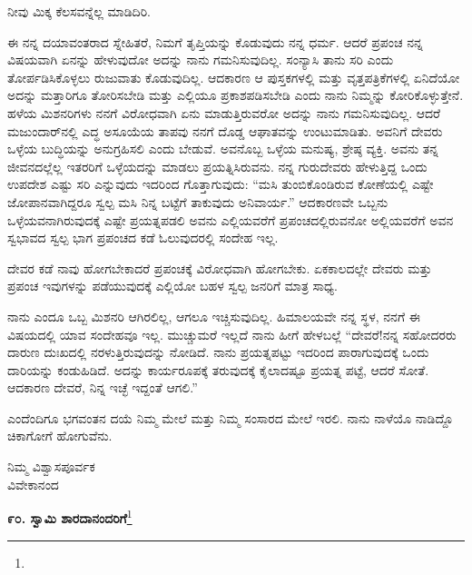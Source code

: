 \vspace{0.1cm}

ನೀವು ಮಿಕ್ಕ ಕೆಲಸವನ್ನೆಲ್ಲ ಮಾಡಿದಿರಿ.

ಈ ನನ್ನ ದಯಾವಂತರಾದ ಸ್ನೇಹಿತರೆ, ನಿಮಗೆ ತೃಪ್ತಿಯನ್ನು ಕೊಡುವುದು ನನ್ನ ಧರ್ಮ. ಆದರೆ ಪ್ರಪಂಚ ನನ್ನ ವಿಷಯವಾಗಿ ಏನನ್ನು ಹೇಳುವುದೋ ಅದನ್ನು ನಾನು ಗಮನಿಸುವುದಿಲ್ಲ. ಸಂನ್ಯಾಸಿ ತಾನು ಸರಿ ಎಂದು ತೋರ್ಪಡಿಸಿಕೊಳ್ಳಲು ರುಜುವಾತು ಕೊಡುವುದಿಲ್ಲ. ಆದಕಾರಣ ಆ ಪುಸ್ತಕಗಳಲ್ಲಿ ಮತ್ತು ವೃತ್ತಪತ್ರಿಕೆಗಳಲ್ಲಿ ಏನಿದೆಯೋ ಅದನ್ನು ಮತ್ತಾರಿಗೂ ತೋರಿಸಬೇಡಿ ಮತ್ತು ಎಲ್ಲಿಯೂ ಪ್ರಕಾಶಪಡಿಸಬೇಡಿ ಎಂದು ನಾನು ನಿಮ್ಮನ್ನು ಕೋರಿಕೊಳ್ಳುತ್ತೇನೆ. ಹಳೆಯ ಮಿಶನರಿಗಳು ನನಗೆ ವಿರೋಧವಾಗಿ ಏನು ಮಾಡುತ್ತಿರುವರೋ ಅದನ್ನು ನಾನು ಗಮನಿಸುವುದಿಲ್ಲ. ಆದರೆ ಮಜುಂದಾರ್‌ನಲ್ಲಿ ಎದ್ಧ ಅಸೂಯೆಯ ತಾಪವು ನನಗೆ ದೊಡ್ಡ ಆಘಾತವನ್ನು ಉಂಟುಮಾಡಿತು. ಅವನಿಗೆ ದೇವರು ಒಳ್ಳೆಯ ಬುದ್ಧಿಯನ್ನು ಅನುಗ್ರಹಿಸಲಿ ಎಂದು ಬೇಡುವೆ. ಅವನೊಬ್ಬ ಒಳ್ಳೆಯ ಮನುಷ್ಯ, ಶ್ರೇಷ್ಠ ವ್ಯಕ್ತಿ. ಅವನು ತನ್ನ ಜೀವನದಲ್ಲೆಲ್ಲ ಇತರರಿಗೆ ಒಳ್ಳೆಯದನ್ನು ಮಾಡಲು ಪ್ರಯತ್ನಿಸಿರುವನು. ನನ್ನ ಗುರುದೇವರು ಹೇಳುತ್ತಿದ್ದ ಒಂದು ಉಪದೇಶ ಎಷ್ಟು ಸರಿ ಎನ್ನುವುದು ಇದರಿಂದ ಗೊತ್ತಾಗುವುದು: “ಮಸಿ ತುಂಬಿಕೊಂಡಿರುವ ಕೋಣೆಯಲ್ಲಿ ಎಷ್ಟೇ ಜೋಪಾನವಾಗಿದ್ದರೂ ಸ್ವಲ್ಪ ಮಸಿ ನಿನ್ನ ಬಟ್ಟೆಗೆ ತಾಕುವುದು ಅನಿವಾರ್ಯ.” ಆದಕಾರಣವೇ ಒಬ್ಬನು ಒಳ್ಳೆಯವನಾಗಿರುವುದಕ್ಕೆ ಎಷ್ಟೇ ಪ್ರಯತ್ನಪಡಲಿ ಅವನು ಎಲ್ಲಿಯವರೆಗೆ ಪ್ರಪಂಚದಲ್ಲಿರುವನೋ ಅಲ್ಲಿಯವರೆಗೆ ಅವನ ಸ್ವಭಾವದ ಸ್ವಲ್ಪ ಭಾಗ ಪ್ರಪಂಚದ ಕಡೆ ಓಲುವುದರಲ್ಲಿ ಸಂದೇಹ ಇಲ್ಲ.

\vspace{0.1cm}

ದೇವರ ಕಡೆ ನಾವು ಹೋಗಬೇಕಾದರೆ ಪ್ರಪಂಚಕ್ಕೆ ವಿರೋಧವಾಗಿ ಹೋಗಬೇಕು. ಏಕಕಾಲದಲ್ಲೇ ದೇವರು ಮತ್ತು ಪ್ರಪಂಚ ಇವುಗಳನ್ನು ಪಡೆಯುವುದಕ್ಕೆ ಎಲ್ಲಿಯೋ ಬಹಳ ಸ್ವಲ್ಪ ಜನರಿಗೆ ಮಾತ್ರ ಸಾಧ್ಯ.

\vspace{0.1cm}

ನಾನು ಎಂದೂ ಒಬ್ಬ ಮಿಶನರಿ ಆಗಿರಲಿಲ್ಲ, ಆಗಲೂ ಇಚ್ಚಿಸುವುದಿಲ್ಲ. ಹಿಮಾಲಯವೇ ನನ್ನ ಸ್ಥಳ, ನನಗೆ ಈ ವಿಷಯದಲ್ಲಿ ಯಾವ ಸಂದೇಹವೂ ಇಲ್ಲ. ಮುಚ್ಚುಮರೆ ಇಲ್ಲದೆ ನಾನು ಹೀಗೆ ಹೇಳಬಲ್ಲೆ “ದೇವರೆ!ನನ್ನ ಸಹೋದರರು ದಾರುಣ ದುಃಖದಲ್ಲಿ ನರಳುತ್ತಿರುವುದನ್ನು ನೋಡಿದೆ. ನಾನು ಪ್ರಯತ್ನಪಟ್ಟು ಇದರಿಂದ ಪಾರಾಗುವುದಕ್ಕೆ ಒಂದು ದಾರಿಯನ್ನು ಕಂಡುಹಿಡಿದೆ. ಅದನ್ನು ಕಾರ್ಯರೂಪಕ್ಕೆ ತರುವುದಕ್ಕೆ ಕೈಲಾದಷ್ಟೂ ಪ್ರಯತ್ನ ಪಟ್ಟೆ, ಆದರೆ ಸೋತೆ. ಆದಕಾರಣ ದೇವರೆ, ನಿನ್ನ ಇಚ್ಛೆ ಇದ್ದಂತೆ ಆಗಲಿ.”

\vspace{0.1cm}

ಎಂದೆಂದಿಗೂ ಭಗವಂತನ ದಯೆ ನಿಮ್ಮ ಮೇಲೆ ಮತ್ತು ನಿಮ್ಮ ಸಂಸಾರದ ಮೇಲೆ ಇರಲಿ. ನಾನು ನಾಳೆಯೊ ನಾಡಿದ್ದೊ ಚಿಕಾಗೋಗೆ ಹೋಗುವೆನು.

{\flushright
ನಿಮ್ಮ ವಿಶ್ವಾಸಪೂರ್ವಕ\\ವಿವೇಕಾನಂದ\par}

\begin{center}
\textbf{೯೦. ಸ್ವಾಮಿ ಶಾರದಾನಂದರಿಗೆ}\footnote{}
\end{center}

